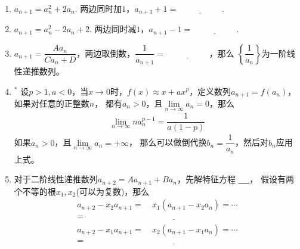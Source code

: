 \documentclass{article}
\newif\ifte
\begin{document}
\begin{multicols}{2}
\begin{enumerate}[leftmargin=20pt]
\item $ a_{n+1}=a_n^2+2a_n $. 两边同时加$ 1 $，$ a_{n+1}+1=
\underline{\ \ifte (a_n+1)^2\else \hspace{2cm} \fi\ } $.

\item $ a_{n+1}=a_n^2-2a_n+2 $. 两边同时减$ 1 $，$ a_{n+1}-1=
\underline{\ \ifte (a_n-1)^2\else \hspace{2cm} \fi\ } $.

\item $ a_{n+1}=\dfrac{Aa_n}{Ca_n+D} $，两边取倒数，$ 
\dfrac{1}{a_{n+1}}=\underline{\ \ifte \dfrac{D}{A}\dfrac{1}{a_n}
    +\dfrac{C}{A}\else \hspace{2cm} \fi\ }$，那么
$ \left\{ \dfrac{1}{a_n}\right\} $为一阶线性递推数列。

\item $^*$ 设$ p>1,a<0 $，当$ x\to 0 $时，$ f(x)\approx 
x+ax^p $，定义数列$ a_{n+1}=f(a_n) $，如果对任意的正整数$ n $，
都有$ a_n>0 $，且$ \lim\limits_{n\to\infty}a_n=0 $，那么
\begin{align*}
    \lim\limits_{n\to\infty}na_n^{p-1}=\dfrac{1}{a(1-p)}
\end{align*}
如果$ a_n>0 $，且$ \lim\limits_{n\to\infty}a_n=+\infty $，
那么可以做倒代换$ b_n=\dfrac{1}{a_n} $，然后对$ b_n $应用上式。

\item 对于二阶线性递推数列$ a_{n+2}=Aa_{n+1}+Ba_n $，先解特征方程
\underline{\ \ifte $ x^2=Ax+B $\else \hspace{2cm} \fi\ }，
假设有两个不等的根$ x_1,x_2 $(可以为复数)，那么
\begin{align*}
    a_{n+2}-x_2a_{n+1}=&\ x_1(a_{n+1}-x_2a_{n})=\cdots \\
    =&\ \underline{\ \ifte x_1^{n}(a_{2}-x_2a_{1})
        \else \hspace{2cm} \fi\ }		\\
    a_{n+2}-x_1a_{n+1}=&\ x_2(a_{n+1}-x_1a_{n})=\cdots \\
    =&\ \underline{\ \ifte x_2^{n}(a_{2}-x_1a_{1})
        \else \hspace{2cm} \fi\ }        
\end{align*}


\end{enumerate}
\end{multicols}
\end{document}
